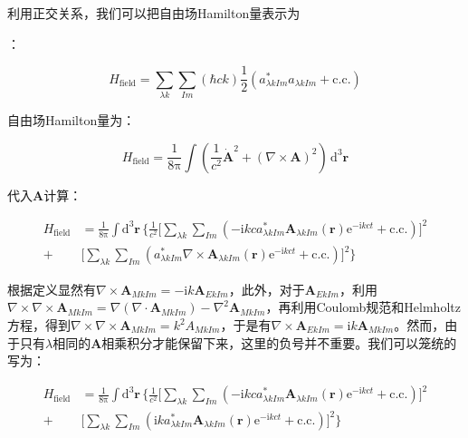 利用正交关系，我们可以把自由场Hamilton量表示为

：

\begin{equation}
H_{\text{field}}=\sum_{\lambda k}\sum_{Im}(\hbar ck)\frac{1}{2}\left(a^{*}_{\lambda kIm}a_{\lambda kIm}+\text{c.c.}\right)
\end{equation}

\begin{booknote*}
自由场Hamilton量为：

\[
H_{\text{field}}=\frac{1}{8\mathrm{\pi}}\int\left(\frac{1}{c^{2}}\dot{\boldsymbol{A}}^{2}+(\nabla\times\boldsymbol{A})^{2}\right)\,\mathrm{d}^{3}\boldsymbol{r}
\]

代入$\boldsymbol{A}$计算：

\begin{align*}
H_{\text{field}} & =\frac{1}{8\mathrm{\pi}}\int\mathrm{d}^{3}\boldsymbol{r}\,\Biggl\{\frac{1}{c^{2}}\Biggl[\sum_{\lambda k}\sum_{Im}\left(-\mathrm{i}kca^{*}_{\lambda kIm}\boldsymbol{A}_{\lambda kIm}(\boldsymbol{r})\mathrm{e}^{-\mathrm{i}kct}+\text{c.c.}\right)\Biggr]^{2}\\
+ & \Biggl[\sum_{\lambda k}\sum_{Im}\left(a^{*}_{\lambda kIm}\nabla\times\boldsymbol{A}_{\lambda kIm}(\boldsymbol{r})\mathrm{e}^{-\mathrm{i}kct}+\text{c.c.}\right)\Biggr]^{2}\Biggr\}
\end{align*}

根据定义显然有$\nabla\times\boldsymbol{A}_{MkIm}=-\mathrm{i}k\boldsymbol{A}_{EkIm}$，此外，对于$\boldsymbol{A}_{EkIm}$，利用$\nabla\times\nabla\times\boldsymbol{A}_{MkIm}=\nabla(\nabla\cdot\boldsymbol{A}_{MkIm})-\nabla^{2}\boldsymbol{A}_{MkIm}$，再利用Coulomb规范和Helmholtz方程，得到$\nabla\times\nabla\times\boldsymbol{A}_{MkIm}=k^{2}A_{MkIm}$，于是有$\nabla\times\boldsymbol{A}_{EkIm}=\mathrm{i}k\boldsymbol{A}_{MkIm}$。然而，由于只有$\lambda$相同的$\boldsymbol{A}$相乘积分才能保留下来，这里的负号并不重要。我们可以笼统的写为：

\begin{align*}
H_{\text{field}} & =\frac{1}{8\mathrm{\pi}}\int\mathrm{d}^{3}\boldsymbol{r}\,\Biggl\{\frac{1}{c^{2}}\Biggl[\sum_{\lambda k}\sum_{Im}\left(-\mathrm{i}kca^{*}_{\lambda kIm}\boldsymbol{A}_{\lambda kIm}(\boldsymbol{r})\mathrm{e}^{-\mathrm{i}kct}+\text{c.c.}\right)\Biggr]^{2}\\
+ & \Biggl[\sum_{\lambda k}\sum_{Im}\left(\mathrm{i}ka^{*}_{\lambda kIm}\boldsymbol{A}_{\lambda kIm}(\boldsymbol{r})\mathrm{e}^{-\mathrm{i}kct}+\text{c.c.}\right)\Biggr]^{2}\Biggr\}
\end{align*}


\end{booknote*}
